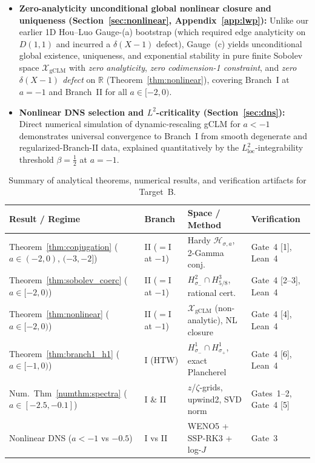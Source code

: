 \documentclass[11pt,a4paper]{article}
\begin{document}
\begin{itemize}
  \item \textbf{Zero-analyticity unconditional global nonlinear closure and uniqueness (Section~\ref{sec:nonlinear}, Appendix~\ref{app:lwp}):} Unlike our earlier 1D Hou--Luo Gauge-(a) bootstrap (which required edge analyticity on $D(1,1)$ and incurred a $\delta(X-1)$ defect), Gauge~(c) yields unconditional global existence, uniqueness, and exponential stability in pure finite Sobolev space $\mathcal{X}_{\mathrm{gCLM}}$ with \emph{zero analyticity}, \emph{zero codimension-1 constraint}, and \emph{zero $\delta(X-1)$ defect} on $\mathbb{R}$ (Theorem~\ref{thm:nonlinear}), covering Branch~I at $a=-1$ and Branch~II for all $a \in [-2,0)$.
  \item \textbf{Nonlinear DNS selection and $L^2$-criticality (Section~\ref{sec:dns}):} Direct numerical simulation of dynamic-rescaling gCLM for $a < -1$ demonstrates universal convergence to Branch~I from smooth degenerate and regularized-Branch-II data, explained quantitatively by the $L^2_{\mathrm{loc}}$-integrability threshold $\beta = \frac{1}{2}$ at $a = -1$.
\end{itemize}

\begin{table}[t]
\centering
\footnotesize
\begin{tabular}{@{}llll@{}}
\toprule
Result / Regime & Branch & Space / Method & Verification \\
\midrule
Theorem~\ref{thm:conjugation} ($a\!\in\!(-2,0)$, $(-3,-2]$) & II ($=$I at $-1$) & Hardy $\mathcal{H}_{\sigma,a}$, 2-Gamma conj. & Gate~4 [1], Lean~4 \\
Theorem~\ref{thm:sobolev_coerc} ($a \in [-2,0)$) & II ($=$I at $-1$) & $H^2_{\sigma_-}\cap H^3_{5/8}$, rational cert. & Gate~4 [2--3], Lean~4 \\
Theorem~\ref{thm:nonlinear} ($a \in [-2,0)$) & II ($=$I at $-1$) & $\mathcal{X}_{\mathrm{gCLM}}$ (non-analytic), NL closure & Gate~4 [4], Lean~4 \\
Theorem~\ref{thm:branch1_h1} ($a \in [-1,0)$) & I (HTW) & $H^1_{\sigma_-}\cap H^1_{\sigma_+}$, exact Plancherel & Gate~4 [6], Lean~4 \\
Num.\ Thm~\ref{numthm:spectra} ($a \in [-2.5,-0.1]$) & I \& II & $z$/$\zeta$-grids, upwind2, SVD norm & Gates~1--2, Gate~4 [5] \\
Nonlinear DNS ($a < -1$ vs $-0.5$) & I vs II & WENO5 + SSP-RK3 + log-$J$ & Gate~3 \\
\bottomrule
\end{tabular}
\caption{Summary of analytical theorems, numerical results, and verification artifacts for Target~B.}
\label{tab:overview}
\end{table}
\end{document}
